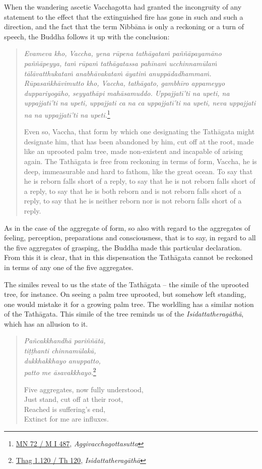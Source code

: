 When the wandering ascetic Vacchagotta had granted the incongruity of any statement to the effect that the extinguished fire has gone in such and such a direction, and the fact that the term Nibbāna is only a reckoning or a turn of speech, the Buddha follows it up with the conclusion:

\begin{quote}
\emph{Evameva kho, Vaccha, yena rūpena tathāgataṁ paññāpayamāno paññāpeyya, taṁ rūpaṁ tathāgatassa pahīnaṁ ucchinnamūlaṁ tālāvatthukataṁ anabhāvakataṁ āyatiṁ anuppādadhammaṁ. Rūpasaṅkhāvimutto kho, Vaccha, tathāgato, gambhīro appameyyo duppariyogāho, seyyathāpi mahāsamuddo. Uppajjatī'ti na upeti, na uppajjatī'ti na upeti, uppajjati ca na ca uppajjatī'ti na upeti, neva uppajjati na na uppajjatī'ti na upeti.}\footnote{\href{https://suttacentral.net/mn72/pli/ms}{MN 72 / M I 487}, \emph{Aggivacchagottasutta}}

Even so, Vaccha, that form by which one designating the Tathāgata might designate him, that has been abandoned by him, cut off at the root, made like an uprooted palm tree, made non-existent and incapable of arising again. The Tathāgata is free from reckoning in terms of form, Vaccha, he is deep, immeasurable and hard to fathom, like the great ocean. To say that he is reborn falls short of a reply, to say that he is not reborn falls short of a reply, to say that he is both reborn and is not reborn falls short of a reply, to say that he is neither reborn nor is not reborn falls short of a reply.
\end{quote}

As in the case of the aggregate of form, so also with regard to the aggregates of feeling, perception, preparations and consciousness, that is to say, in regard to all the five aggregates of grasping, the Buddha made this particular declaration. From this it is clear, that in this dispensation the Tathāgata cannot be reckoned in terms of any one of the five aggregates.

The similes reveal to us the state of the Tathāgata -- the simile of the uprooted tree, for instance. On seeing a palm tree uprooted, but somehow left standing, one would mistake it for a growing palm tree. The worldling has a similar notion of the Tathāgata. This simile of the tree reminds us of the \emph{Isidattatheragāthā}, which has an allusion to it.

\begin{quote}
\emph{Pañcakkhandhā pariññātā,}\\
\emph{tiṭṭhanti chinnamūlakā,}\\
\emph{dukkhakkhayo anuppatto,}\\
\emph{patto me āsavakkhayo.}\footnote{\href{https://suttacentral.net/thag1.120/pli/ms}{Thag 1.120 / Th 120}, \emph{Isidattatheragāthā}}

Five aggregates, now fully understood,\\
Just stand, cut off at their root,\\
Reached is suffering's end,\\
Extinct for me are influxes.
\end{quote}

